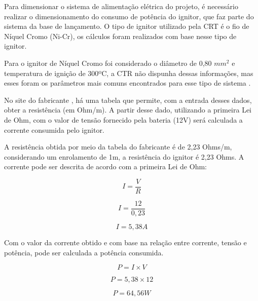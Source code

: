 \par Para dimensionar o sistema de alimentação elétrica do projeto, é necessário realizar o dimensionamento do consumo de potência do ignitor, que faz parte do sistema da base de lançamento. O tipo de ignitor utilizado pela CRT é o fio de Níquel Cromo (Ni-Cr), os cálculos foram realizados com base nesse tipo de ignitor.

\par Para o ignitor de Níquel Cromo foi considerado o diâmetro de 0,80  $mm^2$ e temperatura de ignição de 300ºC, a CTR não dispunha dessas informações, mas esses foram os parâmetros mais comuns encontrados para esse tipo de sistema \cite{edufer2020}.  

\par No site do fabricante \cite{ignitor}, há uma tabela que permite, com a entrada desses dados, obter a resistência (em Ohm/m). A partir desse dado, utilizando a primeira Lei de Ohm, com o valor de tensão fornecido pela bateria (12V) será calculada a corrente consumida pelo ignitor.

\par A resistência obtida por meio da tabela do fabricante é de 2,23 Ohms/m, considerando um enrolamento de 1m, a resistência do ignitor é 2,23 Ohms. A corrente pode ser descrita de acordo com a primeira Lei de Ohm:

\begin{center}
\begin{equation}
 I = \frac{V} {R} 
 \end{equation}
 
 \begin{equation}
 I = \frac{12} {0,23}
 \end{equation}
 
 \begin{equation}
 I = 5,38 A
\end{equation}
\end{center}

\par Com o valor da corrente obtido e com base na relação entre corrente, tensão e potência, pode ser calculada a potência consumida.

\begin{center}
\begin{equation}\label{m}
	P = I \times V 
    \end{equation}
    
 \begin{equation}
  P =  5,38 \times 12 
  \end{equation}
  
  \begin{equation}
  P = 64,56 W 
\end{equation}
\end{center}


